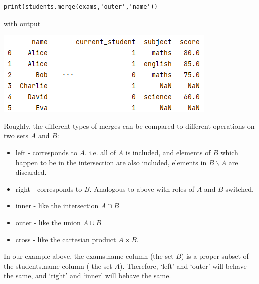 \documentclass[8pt]{extarticle}
\begin{document}
\begin{multicols}{4}
\begin{lstlisting}[style=Python]
print(students.merge(exams,'outer','name'))
\end{lstlisting}

with output
\begin{center}
\includegraphics[scale = 0.5]{images/outer_merge.png}
\end{center}

Roughly, the different types of merges can be compared to different operations on two sets $A$ and $B$:

\begin{itemize}
    \item left - corresponds to $A$. i.e. all of $A$ is included, and elements of $B$ which happen to be in the intersection are also included, elements in $B \backslash A$ are discarded.
    \item right - corresponds to $B$. Analogous to above with roles of $A$ and $B$ switched.
    \item inner - like the intersection $A \cap B$
    \item outer - like the union $A \cup B$
    \item cross - like the cartesian product $A \times B$.
\end{itemize}
In our example above, the exams.name column (the set $B$) is a proper subset of the students.name column ( the set $A$). Therefore, `left' and `outer' will behave the same, and `right' and `inner' will behave the same.

\end{multicols}
\newpage
\thispagestyle{empty} 
\end{document}
